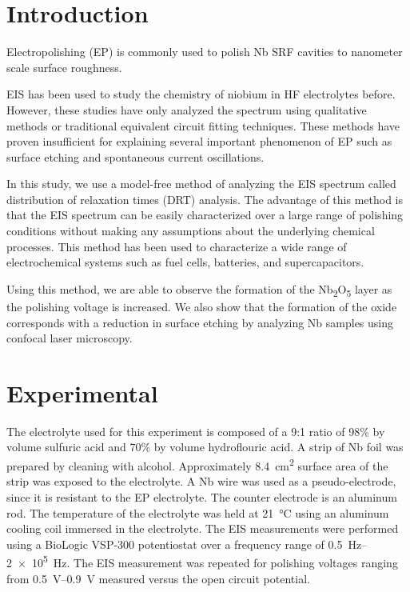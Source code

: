 \documentclass{revtex4-2}
\begin{document}
\maketitle



\section{Introduction}
\label{sec:org5ef967f}
Electropolishing (EP) is commonly used to polish Nb SRF cavities to nanometer scale surface roughness. 

EIS has been used to study the chemistry of niobium in HF electrolytes before.\cite{cattarin2002nb,Tian_2008, tian2008novel, ranjith2018anodic} However, these studies have only analyzed the spectrum using qualitative methods or traditional equivalent circuit fitting techniques. These methods have proven insufficient for explaining several important phenomenon of EP such as surface etching and spontaneous current oscillations.

In this study, we use a model-free method of analyzing the EIS spectrum called distribution of relaxation times (DRT) analysis. The advantage of this method is that the EIS spectrum can be easily characterized over a large range of polishing conditions without making any assumptions about the underlying chemical processes.\cite{10.1063/1.1745355, wan2015influence, ZHANG2015464} This method has been used to characterize a wide range of electrochemical systems such as fuel cells,\cite{Sonn_2008, schichlein2002deconvolution, Leonide_2008} batteries,\cite{SCHMIDT201370, batteries5020043, SONI202297} and supercapacitors.\cite{HELSETH2019100912}

Using this method, we are able to observe the formation of the Nb\textsubscript{2}O\textsubscript{5} layer as the polishing voltage is increased. We also show that the formation of the oxide corresponds with a reduction in surface etching by analyzing Nb samples using confocal laser microscopy.


\section{Experimental}
\label{sec:orgb71f960}

The electrolyte used for this experiment is composed of a 9:1 ratio of 98\% by volume sulfuric acid and 70\% by volume hydroflouric acid. A strip of Nb foil was prepared by cleaning with alcohol. Approximately \qty{8.4}{\centi\meter\squared} surface area of the strip was exposed to the electrolyte. A Nb wire was used as a pseudo-electrode, since it is resistant to the EP electrolyte. The counter electrode is an aluminum rod. The temperature of the electrolyte was held at \qty{21}{\celsius} using an aluminum cooling coil immersed in the electrolyte. The EIS measurements were performed using a BioLogic VSP-300 potentiostat over a frequency range of \qtyrange{0.5}{2e5}{\hertz}. The EIS measurement was repeated for polishing voltages ranging from \qtyrange{0.5}{0.9}{\volt} measured versus the open circuit potential.
\end{document}
